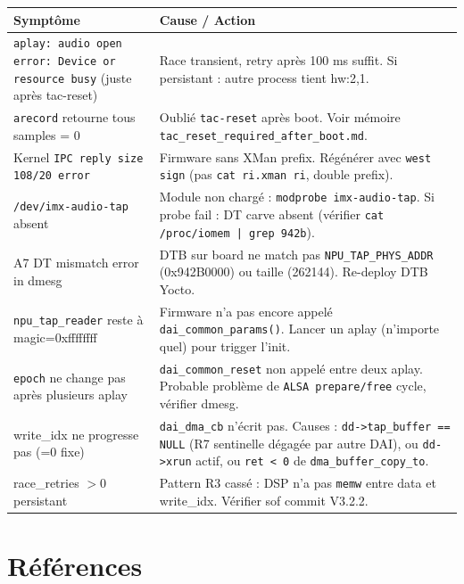 \documentclass[11pt,a4paper]{article}
\begin{document}
\begin{tabularx}{\textwidth}{p{4.5cm}X}
\toprule
\textbf{Symptôme} & \textbf{Cause / Action} \\
\midrule
\texttt{aplay: audio open error: Device or resource busy} (juste après tac-reset) &
Race transient, retry après 100 ms suffit. Si persistant : autre process tient hw:2,1. \\
\addlinespace
\texttt{arecord} retourne tous samples = 0 &
Oublié \texttt{tac-reset} après boot. Voir mémoire \texttt{tac\_reset\_required\_after\_boot.md}. \\
\addlinespace
Kernel \texttt{IPC reply size 108/20 error} &
Firmware sans XMan prefix. Régénérer avec \texttt{west sign} (pas \texttt{cat ri.xman ri}, double prefix). \\
\addlinespace
\texttt{/dev/imx-audio-tap} absent &
Module non chargé : \texttt{modprobe imx-audio-tap}. Si probe fail : DT carve absent (vérifier \texttt{cat /proc/iomem | grep 942b}). \\
\addlinespace
A7 DT mismatch error in dmesg &
DTB sur board ne match pas \texttt{NPU\_TAP\_PHYS\_ADDR} (0x942B0000) ou taille (262144). Re-deploy DTB Yocto. \\
\addlinespace
\texttt{npu\_tap\_reader} reste à magic=0xffffffff &
Firmware n'a pas encore appelé \texttt{dai\_common\_params()}. Lancer un aplay (n'importe quel) pour trigger l'init. \\
\addlinespace
\texttt{epoch} ne change pas après plusieurs aplay &
\texttt{dai\_common\_reset} non appelé entre deux aplay. Probable problème de \texttt{ALSA prepare/free} cycle, vérifier dmesg. \\
\addlinespace
write\_idx ne progresse pas (=0 fixe) &
\texttt{dai\_dma\_cb} n'écrit pas. Causes : \texttt{dd->tap\_buffer == NULL} (R7 sentinelle dégagée par autre DAI), ou \texttt{dd->xrun} actif, ou \texttt{ret < 0} de \texttt{dma\_buffer\_copy\_to}. \\
\addlinespace
race\_retries $> 0$ persistant &
Pattern R3 cassé : DSP n'a pas \texttt{memw} entre data et write\_idx. Vérifier sof commit V3.2.2. \\
\bottomrule
\end{tabularx}

\section{Références}
\end{document}
